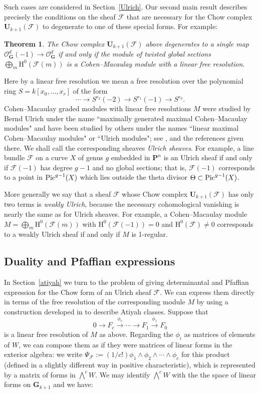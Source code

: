 \documentclass{jams-l}
\newtheorem{theorem}{Theorem}[section]
\theoremstyle{definition}
\theoremstyle{remark}
\newcommand{\F}{{\mathcal F}}
\newcommand{\GG}{{\mathbf G}}
\newcommand{\Hrm}{{\mathrm H}}
\newcommand{\Ocal}{{\mathcal O}}
\newcommand{\PP}{{\mathbf P}}
\newcommand{\UU}{{\mathbf U}}
\newcommand{\Pic}{\mathop{\rm Pic}}
\newcommand{\rTo}{\xrightarrow}
\newcommand{\rTox}{\rightarrow}
\begin{document}
Such cases are considered in Section~\ref{Ulrich}.
Our second main result describes precisely the
conditions on the sheaf $\F$ that are necessary for the Chow complex
$\UU_{k+1}(\F)$ to degenerate to one of these special forms. For example:

\begin{theorem}\label{second main} The Chow complex $\UU_{k+1}(\F)$
  above degenerates 
to a single map $\Ocal_\GG^d(-1)\to\Ocal_\GG^d$ if and only if the 
module of twisted global sections 
$\bigoplus_m \Hrm^0(\F(m))$ is a Cohen--Macaulay module
with a linear free resolution.
\end{theorem}

Here by a linear free resolution we mean a 
free resolution over the polynomial ring $S=k[x_0,\ldots,x_r]$ of the form
\[
\cdots\rTox S^{r_2}(-2)\rTox S^{r_1}(-1)\rTox S^{r_0}.
\] 
Cohen--Macaulay graded modules with linear free resolutions $M$
were studied by Bernd Ulrich under the name ``maximally generated
maximal Cohen--Macaulay modules" \cite{Ulrich 1984} and have been
studied by others
under the names ``linear maximal Cohen--Macaulay modules" or 
``Ulrich modules"; see \cite{Brennanetal.1987}, 
\cite[1989]{Backelin and Herzog} and 
the references given there. We shall call the
corresponding sheaves {\it Ulrich sheaves\/}. For example, a line
bundle $\F$ on a curve $X$ of genus $g$ embedded in $\PP^n$ is an
Ulrich sheaf if and only if $\F(-1)$ has degree $g-1$ and no global
sections; that is, $\F(-1)$ corresponds to a point in $\Pic^{g-1}(X)$
which lies outside the theta divisor $\Theta \subset \Pic^{g-1}(X)$.

More generally
we say that a sheaf $\F$ whose Chow complex $\UU_{k+1}(\F)$ has only two terms
is {\it weakly Ulrich}, because the necessary cohomological vanishing is
nearly the same as for Ulrich sheaves. For example, a Cohen--Macaulay module
$M=\bigoplus_m \Hrm^0(\F(m))$ with $\Hrm^0(\F(-1))=0$ and $\Hrm^0(\F) \not= 0$
corresponds to a weakly Ulrich sheaf if and only if $M$ is 1-regular. 
 
\subsection*{Duality and Pfaffian expressions}

In Section~\ref{atiyah} we turn to the problem of giving
determinantal and Pfaffian expression for the Chow form of an 
Ulrich sheaf $\F$.
We can express them
directly in terms of the free resolution of the corresponding module $M$
by using a construction developed in \cite{AngeniolandLejeune-Jalabert1989}
to describe Atiyah classes. Suppose that
\[
0\to F_c\rTo{\phi_c}\cdots \rTox F_1\rTo{\phi_1}F_0
\]
is a linear free resolution of $M$ as above.
Regarding the $\phi_i$ as matrices of elements of $W$, we can compose
them as if they were matrices of linear forms in the exterior
algebra: we write $\Psi_\F:=(1/c!)\phi_1\wedge\phi_2\wedge\cdots\wedge \phi_c$
for this product (defined in a slightly different way in
positive characteristic), which is represented by a matrix of 
forms in $\bigwedge^cW$. We may identify $\bigwedge^cW$ with the 
the space of linear forms on $\GG_{k+1}$ and we have:
\end{document}
